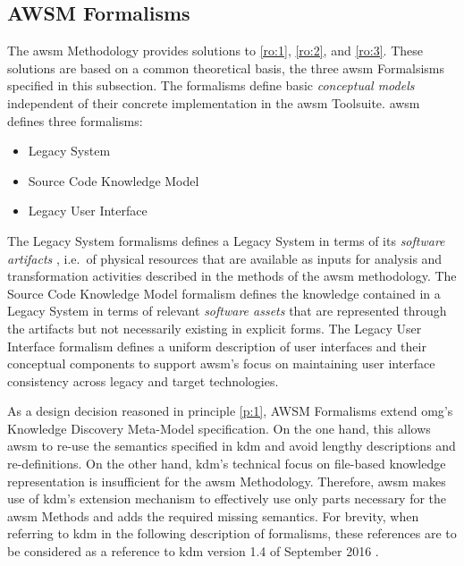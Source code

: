 \hypertarget{sec:formalisms}{%
\subsection{AWSM Formalisms}\label{sec:formalisms}}

The \gls{awsm} Methodology provides solutions to \cref{ro:1}, \cref{ro:2}, and \cref{ro:3}.
These solutions are based on a common theoretical basis, the three \gls{awsm} Formalsisms specified in this subsection.
The formalisms define basic \emph{conceptual models} independent of their concrete implementation in the \gls{awsm} Toolsuite.
\gls{awsm} defines three formalisms:
\begin{itemize}
\item Legacy System
\item Source Code Knowledge Model
\item Legacy User Interface
\end{itemize}
The \gls{Legacy System} formalisms defines a \gls{Legacy System} in terms of its \emph{software \glspl{artifact}} \autocite{OMG2016KDM}, i.e.~of physical resources that are available as inputs for analysis and transformation activities described in the methods of the \gls{awsm} methodology.
The Source Code Knowledge Model formalism defines the knowledge contained in a \gls{Legacy System} in terms of relevant \emph{software assets} \autocite{OMG2016KDM} that are represented through the \glspl{artifact} but not necessarily existing in explicit forms.
The Legacy User Interface formalism defines a uniform description of user interfaces and their conceptual components to support \gls{awsm}'s focus on maintaining user interface consistency across legacy and target technologies.

As a design decision reasoned in principle \cref{p:1}, AWSM Formalisms extend \gls{omg}'s Knowledge Discovery Meta-Model specification.
On the one hand, this allows \gls{awsm} to re-use the semantics specified in \gls{kdm} and avoid lengthy descriptions and re-definitions.
On the other hand, \gls{kdm}'s technical focus on file-based knowledge representation is insufficient for the \gls{awsm} Methodology.
Therefore, \gls{awsm} makes use of \gls{kdm}'s extension mechanism to effectively use only parts necessary \autocite{OMG2016KDM} for the \gls{awsm} Methods and adds the required missing semantics.
For brevity, when referring to \gls{kdm} in the following description of formalisms, these references are to be considered as a reference to \gls{kdm} version 1.4 of September 2016 \autocite{OMG2016KDM}.


